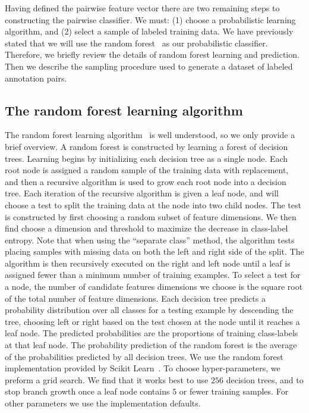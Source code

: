     Having defined the pairwise feature vector there are two remaining steps to constructing the pairwise
      classifier.
    We must:
    (1) choose a probabilistic learning algorithm, and
    (2) select a sample of labeled training data.
    We have previously stated that we will use the random forest~\cite{breiman_random_2001} as our probabilistic
      classifier.
    Therefore, we briefly review the details of random forest learning and prediction.
    Then we describe the sampling procedure used to generate a dataset of labeled annotation pairs.

    \subsection{The random forest learning algorithm}
    The random forest learning algorithm~\cite{breiman_random_2001} is well understood, so we only provide a
      brief overview.
    A random forest is constructed by learning a forest of decision trees.
    Learning begins by initializing each decision tree as a single node.
    Each root node is assigned a random sample of the training data with replacement, and then a recursive
      algorithm is used to grow each root node into a decision tree.
    Each iteration of the recursive algorithm is given a leaf node, and will choose a test to split the training
      data at the node into two child nodes.
    The test is constructed by first choosing a random subset of feature dimensions.
    We then find choose a dimension and threshold to maximize the decrease in class-label entropy.
    Note that when using the ``separate class'' method, the algorithm tests placing samples with missing data on
      both the left and right side of the split.
    The algorithm is then recursively executed on the right and left node until a leaf is assigned fewer than a
      minimum number of training examples.
    To select a test for a node, the number of candidate features dimensions we choose is the square root of the
      total number of feature dimensions.
    Each decision tree predicts a probability distribution over all classes for a testing example by descending
      the tree, choosing left or right based on the test chosen at the node until it reaches a leaf node.
    The predicted probabilities are the proportions of training class-labels at that leaf node.
    The probability prediction of the random forest is the average of the probabilities predicted by all decision
      trees.
    We use the random forest implementation provided by Scikit Learn~\cite{pedregosa_scikit_learn_2011}.
    To choose hyper-parameters, we preform a grid search.
    We find that it works best to use $256$ decision trees, and to stop branch growth once a leaf node contains
      $5$ or fewer training samples.
    For other parameters we use the implementation defaults.


